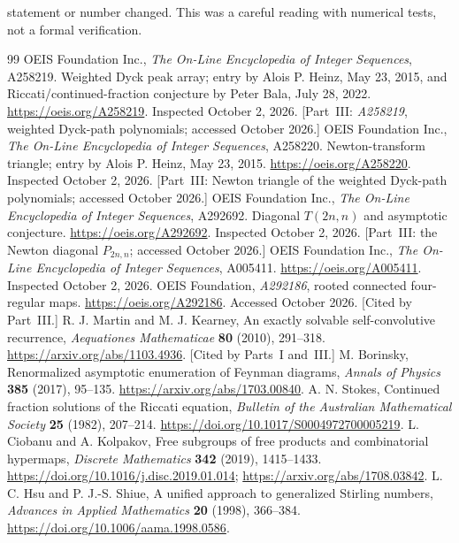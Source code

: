 \documentclass[11pt,letterpaper]{article}
\theoremstyle{remark}\newtheorem{remark}[theorem]{Remark}
\begin{document}
statement or number changed. This was a careful reading with numerical tests, not a formal verification.

\begin{thebibliography}{99}
 OEIS Foundation Inc., \emph{The On-Line Encyclopedia of
Integer Sequences}, A258219. Weighted Dyck peak array; entry by Alois P.
Heinz, May 23, 2015, and Riccati/continued-fraction conjecture by Peter Bala,
July 28, 2022. \url{https://oeis.org/A258219}. Inspected October 2, 2026.
[Part~III: \emph{A258219}, weighted Dyck-path polynomials; accessed October 2026.]
 OEIS Foundation Inc., \emph{The On-Line Encyclopedia of
Integer Sequences}, A258220. Newton-transform triangle; entry by Alois P.
Heinz, May 23, 2015. \url{https://oeis.org/A258220}. Inspected October 2, 2026.
[Part~III: Newton triangle of the weighted Dyck-path polynomials; accessed October 2026.]
 OEIS Foundation Inc., \emph{The On-Line Encyclopedia of
Integer Sequences}, A292692. Diagonal $T(2n,n)$ and asymptotic conjecture.
\url{https://oeis.org/A292692}. Inspected October 2, 2026.
[Part~III: the Newton diagonal $P_{2n,n}$; accessed October 2026.]
 OEIS Foundation Inc., \emph{The On-Line Encyclopedia of
Integer Sequences}, A005411. \url{https://oeis.org/A005411}.
Inspected October 2, 2026.
 OEIS Foundation, \emph{A292186}, rooted connected
four-regular maps. \url{https://oeis.org/A292186}. Accessed October 2026. [Cited by Part~III.]
 R. J. Martin and M. J. Kearney, An exactly solvable
self-convolutive recurrence, \emph{Aequationes Mathematicae} \textbf{80}
(2010), 291--318. \url{https://arxiv.org/abs/1103.4936}. [Cited by Parts~I and~III.]
 M. Borinsky, Renormalized asymptotic enumeration of
Feynman diagrams, \emph{Annals of Physics} \textbf{385} (2017), 95--135.
\url{https://arxiv.org/abs/1703.00840}.
 A. N. Stokes, Continued fraction solutions of the Riccati
equation, \emph{Bulletin of the Australian Mathematical Society}
\textbf{25} (1982), 207--214.
\url{https://doi.org/10.1017/S0004972700005219}.
 L. Ciobanu and A. Kolpakov,
Free subgroups of free products and combinatorial hypermaps,
\emph{Discrete Mathematics} \textbf{342} (2019), 1415--1433.
\url{https://doi.org/10.1016/j.disc.2019.01.014};
\url{https://arxiv.org/abs/1708.03842}.
 L. C. Hsu and P. J.-S. Shiue,
A unified approach to generalized Stirling numbers,
\emph{Advances in Applied Mathematics} \textbf{20} (1998), 366--384.
\url{https://doi.org/10.1006/aama.1998.0586}.

\end{thebibliography}
\end{document}
